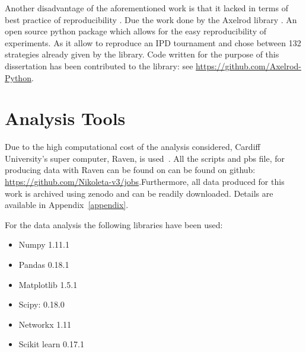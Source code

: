 Another disadvantage of the aforementioned work is that it lacked in terms of
best practice of reproducibility \cite{Axelrod1980a,Axelrod1980b,Stephens2002,Chong2004,Stewart2013}.
Due the work done by the Axelrod library \cite{axelrodproject}.
An open source python package which allows for the easy
reproducibility of experiments. As it allow to reproduce an IPD tournament and
chose between 132 strategies already given by the library. Code written for the
purpose of this dissertation has been contributed to the library: see
\url{https://github.com/Axelrod-Python}.

\section{Analysis Tools}
Due to the high computational cost of the analysis considered, Cardiff
University's super computer, Raven, is used~\cite{raven}. All the scripts and pbs
file, for producing data with Raven can be found on can be found on github:
\url{https://github.com/Nikoleta-v3/jobs}.Furthermore, all data produced for
this work is archived using zenodo and can be readily downloaded. Details are
available in Appendix~\ref{appendix}.

For the data analysis the following libraries have been used:

\begin{multicols}{2}
	\begin{itemize}
		\item Numpy 1.11.1~\cite{numpy}
		\item Pandas 0.18.1~\cite{pandas}
		\item Matplotlib 1.5.1~\cite{matplot}
		\item Scipy: 0.18.0~\cite{scipy}
		\item Networkx 1.11~\cite{networkx}
    \item Scikit learn 0.17.1~\cite{scikit}
	\end{itemize}
\end{multicols}

